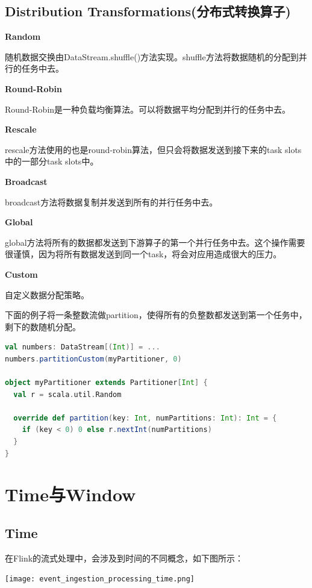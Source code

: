 \documentclass[oneside]{ctexbook}
\begin{document}
\section{Distribution Transformations(分布式转换算子)}

\textbf{Random}

随机数据交换由DataStream.shuffle()方法实现。shuffle方法将数据随机的分配到并行的任务中去。

\textbf{Round-Robin}

Round-Robin是一种负载均衡算法。可以将数据平均分配到并行的任务中去。

\textbf{Rescale}

rescale方法使用的也是round-robin算法，但只会将数据发送到接下来的task slots中的一部分task slots中。

\textbf{Broadcast}

broadcast方法将数据复制并发送到所有的并行任务中去。

\textbf{Global}

global方法将所有的数据都发送到下游算子的第一个并行任务中去。这个操作需要很谨慎，因为将所有数据发送到同一个task，将会对应用造成很大的压力。

\textbf{Custom}

自定义数据分配策略。

下面的例子将一条整数流做partition，使得所有的负整数都发送到第一个任务中，剩下的数随机分配。

\begin{lstlisting}[language=scala]
val numbers: DataStream[(Int)] = ...
numbers.partitionCustom(myPartitioner, 0)

object myPartitioner extends Partitioner[Int] {
  val r = scala.util.Random

  override def partition(key: Int, numPartitions: Int): Int = {
    if (key < 0) 0 else r.nextInt(numPartitions)
  }
}
\end{lstlisting}

\chapter{Time与Window}

\section{Time}

在Flink的流式处理中，会涉及到时间的不同概念，如下图所示：

\noindent \texttt{[image: event\_ingestion\_processing\_time.png]}
\end{document}
